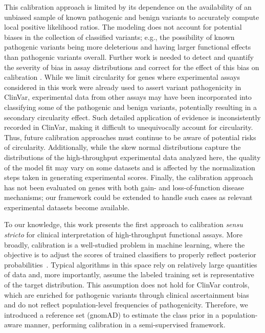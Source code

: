 \documentclass[11pt]{article}
\theoremstyle{plain}
\begin{document}
This calibration approach is limited by its dependence on the availability of an unbiased sample of known pathogenic and benign variants to accurately compute local positive likelihood ratios. The modeling does not account for potential biases in the collection of classified variants; e.g., the possibility of known pathogenic variants being more deleterious and having larger functional effects than pathogenic variants overall. Further work is needed to detect and quantify the severity of bias in assay distributions and correct for the effect of this bias on calibration \cite{de2022approach, zeiberg2023leveraging, zadrozny2004learning}. %
While we limit circularity for genes where experimental assays considered in this work were already used to assert variant pathogenicity in ClinVar, experimental data from other assays may have been incorporated into classifying some of the pathogenic and benign variants, potentially resulting in a secondary circularity effect. Such detailed application of evidence is inconsistently recorded in ClinVar, making it difficult to unequivocally account for circularity. Thus, future calibration approaches must continue to be aware of potential risks of circularity. 
Additionally, while the skew normal distributions capture the distributions of the high-throughput experimental data analyzed here, the quality of the model fit may vary on some datasets and is affected by the normalization steps taken in generating experimental scores. Finally, the calibration approach has not been evaluated on genes with both gain- and loss-of-function disease mechanisms; our framework could be extended to handle such cases as relevant experimental datasets become available. 

To our knowledge, this work presents the first approach to calibration \emph{sensu stricto} for clinical interpretation of high-throughput functional assays. More broadly, calibration is a well-studied problem in machine learning, where the objective is to adjust the scores of trained classifiers to properly reflect posterior probabilities~\cite{Platt1999, Niculescu-Mizil2005, Kim2021}. Typical algorithms in this space rely on relatively large quantities of data and, more importantly, assume the labeled training set is representative of the target distribution. This assumption does not hold for ClinVar controls, which are enriched for pathogenic variants through clinical ascertainment bias and do not reflect population-level frequencies of pathogenicity. Therefore, we introduced a reference set (gnomAD) to estimate the class prior in a population-aware manner, performing calibration in a semi-supervised framework.
\end{document}

